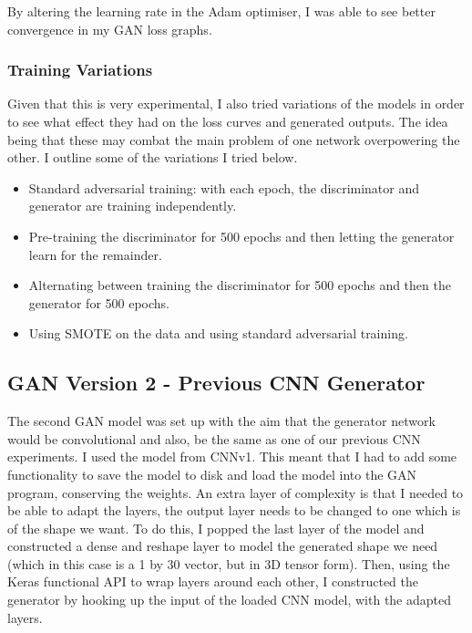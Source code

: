 \documentclass[12pt,a4paper,twoside]{report}
\begin{document}
By altering the learning rate in the Adam optimiser, I was able to see better convergence in my GAN loss graphs. 

\subsubsection{Training Variations}

Given that this is very experimental, I also tried variations of the models in order to see what effect they had on the loss curves and generated outputs. The idea being that these may combat the main problem of one network overpowering the other. I outline some of the variations I tried below.

\begin{itemize}
\item Standard adversarial training: with each epoch, the discriminator and generator are training independently. 
\item Pre-training the discriminator for 500 epochs and then letting the generator learn for the remainder.
\item Alternating between training the discriminator for 500 epochs and then the generator for 500 epochs.
\item Using SMOTE on the data and using standard adversarial training.
\end{itemize}

\subsection{GAN Version 2 - Previous CNN Generator}

The second GAN model was set up with the aim that the generator network would be convolutional and also, be the same as one of our previous CNN experiments. I used the model from CNNv1. This meant that I had to add some functionality to save the model to disk and load the model into the GAN program, conserving the weights. An extra layer of complexity is that I needed to be able to adapt the layers, the output layer needs to be changed to one which is of the shape we want. To do this, I popped the last layer of the model and constructed a dense and reshape layer to model the generated shape we need (which in this case is a 1 by 30 vector, but in 3D tensor form). Then, using the Keras functional API to wrap layers around each other, I constructed the generator by hooking up the input of the loaded CNN model, with the adapted layers. 
\end{document}
